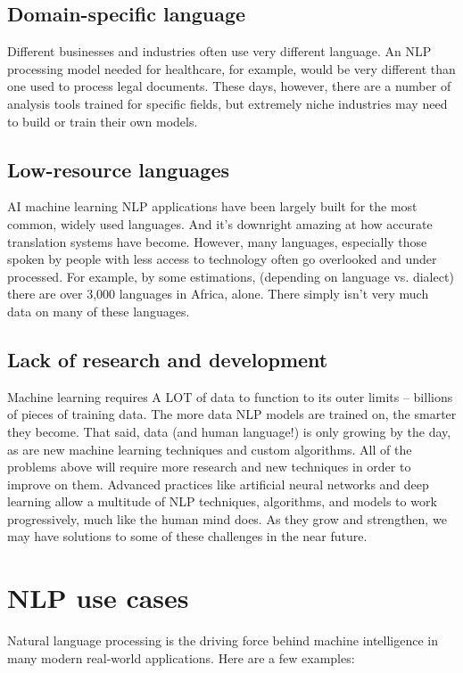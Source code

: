 \documentclass[11pt]{article}
\begin{document}
\subsection{Domain-specific language}
\label{sec:orgb64a009}
Different businesses and industries often use very different language. An NLP
processing model needed for healthcare, for example, would be very different than
one used to process legal documents. These days, however, there are a number of
analysis tools trained for specific fields, but extremely niche industries may need
to build or train their own models.
\subsection{Low-resource languages}
\label{sec:org82a93a2}
AI machine learning NLP applications have been largely built for the most common,
widely used languages. And it’s downright amazing at how accurate translation systems
have become. However, many languages, especially those spoken by people with less
access to technology often go overlooked and under processed. For example, by some
estimations, (depending on language vs. dialect) there are over 3,000 languages in
Africa, alone. There simply isn’t very much data on many of these languages.
\subsection{Lack of research and development}
\label{sec:org40cb9b7}
Machine learning requires A LOT of data to function to its outer limits – billions
of pieces of training data. The more data NLP models are trained on, the smarter
they become. That said, data (and human language!) is only growing by the day, as
are new machine learning techniques and custom algorithms. All of the problems above
will require more research and new techniques in order to improve on them.
Advanced practices like artificial neural networks and deep learning allow a multitude
of NLP techniques, algorithms, and models to work progressively, much like the human
mind does. As they grow and strengthen, we may have solutions to some of these
challenges in the near future.
\clearpage

\section{NLP use cases}
\label{sec:org31641a5}
Natural language processing is the driving force behind machine intelligence in
many modern real-world applications. Here are a few examples:
\end{document}
